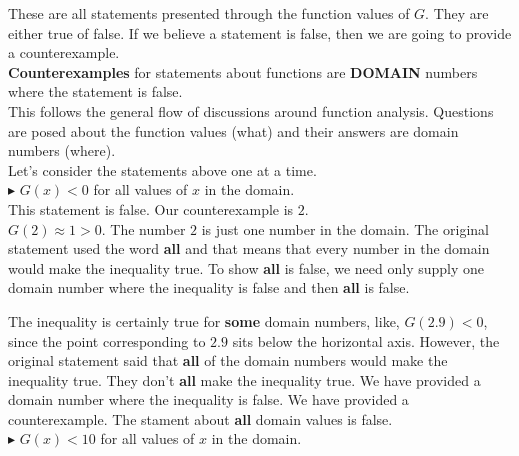 \documentclass{ximera}
\begin{document}
These are all statements presented through the function values of $G$.  They are either true of false.  If we believe a statement is false, then we are going to provide a counterexample. \\

\textbf{\textcolor{red!80!black}{Counterexamples}} for statements about functions are \textbf{\textcolor{red!80!black}{DOMAIN}} numbers where the statement is false. \\


This follows the general flow of discussions around function analysis.  Questions are posed about the function values (what) and their answers are domain numbers (where). \\


Let's consider the statements above one at a time. \\












\textbf{\textcolor{red!90!darkgray}{$\blacktriangleright$}} $G(x) < 0$  for all values of $x$ in the domain. \\


This statement is false. Our counterexample is $2$.  \\

$G(2) \approx 1 > 0$. The number $2$ is just one number in the domain.   The original statement used the word \textbf{all} and that means that every number in the domain would make the inequality true.  To show \textbf{all} is false, we need only supply one domain number where the inequality is false and then \textbf{all} is false.

The inequality is certainly true for \textbf{some} domain numbers, like, $G(2.9) < 0$, since the point corresponding to $2.9$ sits below the horizontal axis.  However, the original statement said that \textbf{all} of the domain numbers would make the inequality true. They don't \textbf{all} make the inequality true.  We have provided a domain number where the inequality is false. We have provided a counterexample. The stament about \textbf{all} domain values is false.\\









\textbf{\textcolor{red!90!darkgray}{$\blacktriangleright$}} $G(x) < 10$  for all values of $x$ in the domain. \\
\end{document}
